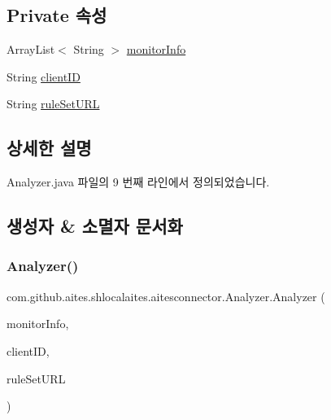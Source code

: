 \subsection*{Private 속성}
\begin{DoxyCompactItemize}
\item 
Array\+List$<$ String $>$ \mbox{\hyperlink{classcom_1_1github_1_1aites_1_1shlocalaites_1_1aitesconnector_1_1_analyzer_a33660c986fcdd452f0d02ddaf34649b5}{monitor\+Info}}
\item 
String \mbox{\hyperlink{classcom_1_1github_1_1aites_1_1shlocalaites_1_1aitesconnector_1_1_analyzer_a22ef8f04e7f85cdb211af143b32d966a}{client\+ID}}
\item 
String \mbox{\hyperlink{classcom_1_1github_1_1aites_1_1shlocalaites_1_1aitesconnector_1_1_analyzer_a4d70ca14c3921f457dbd46c8d1818f36}{rule\+Set\+U\+RL}}
\end{DoxyCompactItemize}


\subsection{상세한 설명}


Analyzer.\+java 파일의 9 번째 라인에서 정의되었습니다.



\subsection{생성자 \& 소멸자 문서화}
\mbox{\label{classcom_1_1github_1_1aites_1_1shlocalaites_1_1aitesconnector_1_1_analyzer_af638d89844738a18372c30f040cdb65e}} 
\subsubsection{\texorpdfstring{Analyzer()}{Analyzer()}}
{\footnotesize\ttfamily com.\+github.\+aites.\+shlocalaites.\+aitesconnector.\+Analyzer.\+Analyzer (\begin{DoxyParamCaption}\item[{Array\+List$<$ String $>$}]{monitor\+Info,  }\item[{String}]{client\+ID,  }\item[{String}]{rule\+Set\+U\+RL }\end{DoxyParamCaption})}



